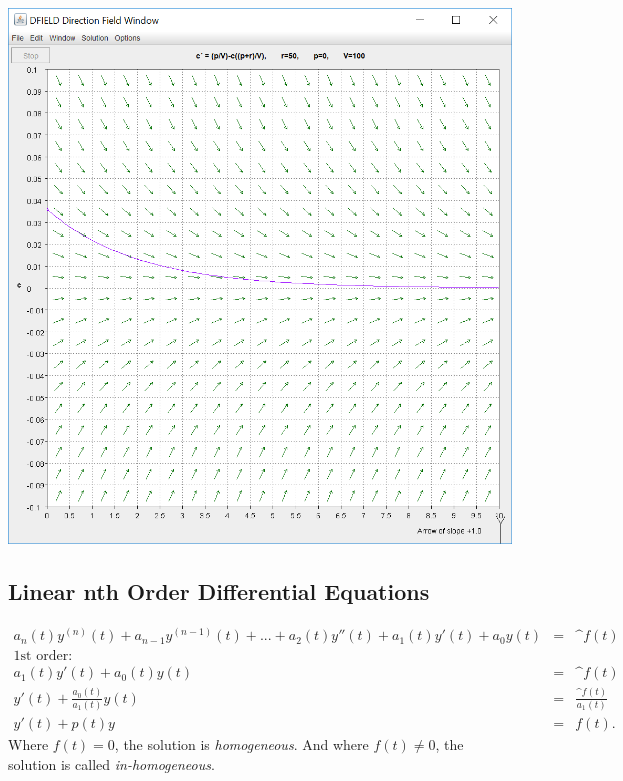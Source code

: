 \documentclass[10pt]{article}
\begin{document}
            \begin{center}\includegraphics[scale=0.5]{lab1p3p10.PNG}\end{center}
    
    
    \newpage

    \subsection{Linear nth Order Differential Equations}
    
        \begin{eqnarray*}
            a_n(t)y^{(n)}(t)+a_{n-1}y^{(n-1)}(t)+ ... + a_2(t)y''(t)+a_1(t)y'(t)+a_0y(t)&=&{\^f}(t)\\
            \text{1st order:}\\
            a_1(t)y'(t)+a_0(t)y(t)&=&\^f(t)\\
            y'(t)+\frac{a_0(t)}{a_1(t)}y(t)&=&\frac{\^f(t)}{a_1(t)}\\
            y'(t)+p(t)y&=&f(t).
        \end{eqnarray*}
        Where $f(t)=0$, the solution is {\it homogeneous}. And where $f(t)\neq 0$, the solution is called {\it in-homogeneous}.
        
\end{document}
